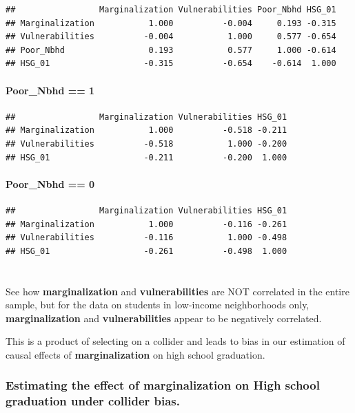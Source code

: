 \documentclass[
]{article}
\begin{document}
\begin{verbatim}
##                 Marginalization Vulnerabilities Poor_Nbhd HSG_01
## Marginalization           1.000          -0.004     0.193 -0.315
## Vulnerabilities          -0.004           1.000     0.577 -0.654
## Poor_Nbhd                 0.193           0.577     1.000 -0.614
## HSG_01                   -0.315          -0.654    -0.614  1.000
\end{verbatim}

\paragraph{Poor\_Nbhd == 1}\label{poor_nbhd-1-1}

\begin{verbatim}
##                 Marginalization Vulnerabilities HSG_01
## Marginalization           1.000          -0.518 -0.211
## Vulnerabilities          -0.518           1.000 -0.200
## HSG_01                   -0.211          -0.200  1.000
\end{verbatim}

\paragraph{Poor\_Nbhd == 0}\label{poor_nbhd-0-1}

\begin{verbatim}
##                 Marginalization Vulnerabilities HSG_01
## Marginalization           1.000          -0.116 -0.261
## Vulnerabilities          -0.116           1.000 -0.498
## HSG_01                   -0.261          -0.498  1.000
\end{verbatim}

\section{}\label{section}

See how \textbf{marginalization} and \textbf{vulnerabilities} are NOT
correlated in the entire sample, but for the data on students in
low-income neighborhoods only, \textbf{marginalization} and
\textbf{vulnerabilities} appear to be negatively correlated.

This is a product of selecting on a collider and leads to bias in our
estimation of causal effects of \textbf{marginalization} on high school
graduation.

\subsubsection{Estimating the effect of marginalization on High school
graduation under collider
bias.}\label{estimating-the-effect-of-marginalization-on-high-school-graduation-under-collider-bias.}
\end{document}
